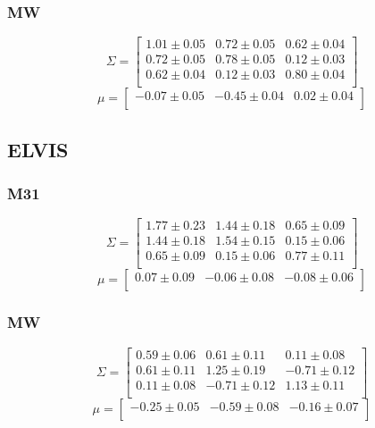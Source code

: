 \documentclass[a4paper,fleqn,usenatbib]{mnras}
\begin{document}
\subsubsection{MW}
\[
\Sigma=
\begin{bmatrix}
1.01 \pm 0.05 & 0.72 \pm 0.05 & 0.62 \pm 0.04\\
0.72 \pm 0.05 & 0.78 \pm 0.05 & 0.12 \pm 0.03\\
0.62 \pm 0.04 & 0.12 \pm 0.03 & 0.80 \pm 0.04\\
\end{bmatrix}
\]
\[
\mu=
\begin{bmatrix}
-0.07 \pm 0.05 & -0.45 \pm 0.04 & 0.02 \pm 0.04\\
\end{bmatrix}
\]

\subsection{ELVIS}

\subsubsection{M31}
\[
\Sigma=
\begin{bmatrix}
1.77 \pm 0.23 & 1.44 \pm 0.18 & 0.65 \pm 0.09\\
1.44 \pm 0.18 & 1.54 \pm 0.15 & 0.15 \pm 0.06\\
0.65 \pm 0.09 & 0.15 \pm 0.06 & 0.77 \pm 0.11\\
\end{bmatrix}
\]
\[
\mu=
\begin{bmatrix}
0.07 \pm 0.09 & -0.06 \pm 0.08 & -0.08 \pm 0.06\\
\end{bmatrix}
\]
\subsubsection{MW}
\[
\Sigma=
\begin{bmatrix}
0.59 \pm 0.06 & 0.61 \pm 0.11 & 0.11 \pm 0.08\\
0.61 \pm 0.11 & 1.25 \pm 0.19 & -0.71 \pm 0.12\\
0.11 \pm 0.08 & -0.71 \pm 0.12 & 1.13 \pm 0.11\\
\end{bmatrix}
\]
\[
\mu=
\begin{bmatrix}
-0.25 \pm 0.05 & -0.59 \pm 0.08 & -0.16 \pm 0.07\\
\end{bmatrix}
\]
\end{document}
